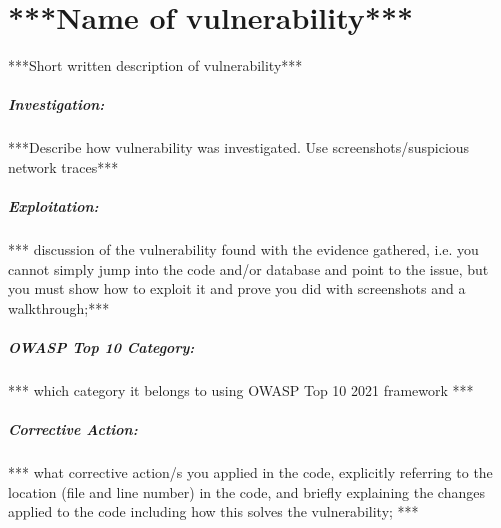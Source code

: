
\section{***Name of vulnerability***}

***Short written description of vulnerability***

\subparagraph{Investigation:}

***Describe how vulnerability was investigated. Use screenshots/suspicious network traces***

\subparagraph{Exploitation:}

*** discussion of the vulnerability found with the evidence gathered, i.e. you cannot simply jump into the code and/or database and point to the issue, but you must show how to exploit it and prove you did with screenshots and a walkthrough;***

\subparagraph{OWASP Top 10 Category:}

*** which category it belongs to using OWASP Top 10 2021 framework ***

\subparagraph{Corrective Action:}

*** what corrective action/s you applied in the code, explicitly referring to the location (file and line number) in the code, and briefly explaining the changes applied to the code including how this solves the vulnerability; ***